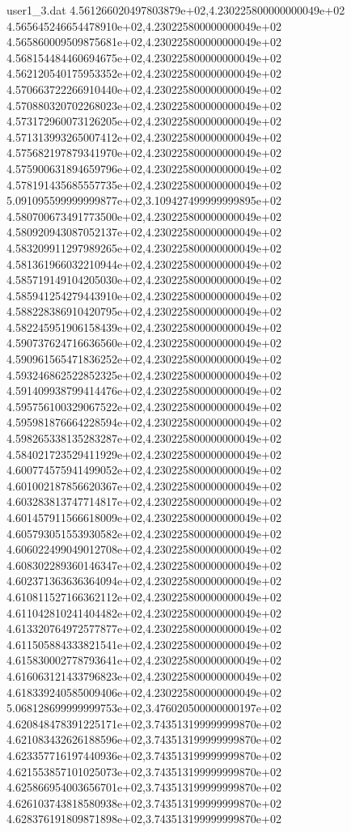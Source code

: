 \begin{filecontents}{user1_3.dat}
4.561266020497803879e+02,4.230225800000000049e+02
4.565645246654478910e+02,4.230225800000000049e+02
4.565860009509875681e+02,4.230225800000000049e+02
4.568154484460694675e+02,4.230225800000000049e+02
4.562120540175953352e+02,4.230225800000000049e+02
4.570663722266910440e+02,4.230225800000000049e+02
4.570880320702268023e+02,4.230225800000000049e+02
4.573172960073126205e+02,4.230225800000000049e+02
4.571313993265007412e+02,4.230225800000000049e+02
4.575682197879341970e+02,4.230225800000000049e+02
4.575900631894659796e+02,4.230225800000000049e+02
4.578191435685557735e+02,4.230225800000000049e+02
5.091095599999999877e+02,3.109427499999999895e+02
4.580700673491773500e+02,4.230225800000000049e+02
4.580920943087052137e+02,4.230225800000000049e+02
4.583209911297989265e+02,4.230225800000000049e+02
4.581361966032210944e+02,4.230225800000000049e+02
4.585719149104205030e+02,4.230225800000000049e+02
4.585941254279443910e+02,4.230225800000000049e+02
4.588228386910420795e+02,4.230225800000000049e+02
4.582245951906158439e+02,4.230225800000000049e+02
4.590737624716636560e+02,4.230225800000000049e+02
4.590961565471836252e+02,4.230225800000000049e+02
4.593246862522852325e+02,4.230225800000000049e+02
4.591409938799414476e+02,4.230225800000000049e+02
4.595756100329067522e+02,4.230225800000000049e+02
4.595981876664228594e+02,4.230225800000000049e+02
4.598265338135283287e+02,4.230225800000000049e+02
4.584021723529411929e+02,4.230225800000000049e+02
4.600774575941499052e+02,4.230225800000000049e+02
4.601002187856620367e+02,4.230225800000000049e+02
4.603283813747714817e+02,4.230225800000000049e+02
4.601457911566618009e+02,4.230225800000000049e+02
4.605793051553930582e+02,4.230225800000000049e+02
4.606022499049012708e+02,4.230225800000000049e+02
4.608302289360146347e+02,4.230225800000000049e+02
4.602371363636364094e+02,4.230225800000000049e+02
4.610811527166362112e+02,4.230225800000000049e+02
4.611042810241404482e+02,4.230225800000000049e+02
4.613320764972577877e+02,4.230225800000000049e+02
4.611505884333821541e+02,4.230225800000000049e+02
4.615830002778793641e+02,4.230225800000000049e+02
4.616063121433796823e+02,4.230225800000000049e+02
4.618339240585009406e+02,4.230225800000000049e+02
5.068128699999999753e+02,3.476020500000000197e+02
4.620848478391225171e+02,3.743513199999999870e+02
4.621083432626188596e+02,3.743513199999999870e+02
4.623357716197440936e+02,3.743513199999999870e+02
4.621553857101025073e+02,3.743513199999999870e+02
4.625866954003656701e+02,3.743513199999999870e+02
4.626103743818580938e+02,3.743513199999999870e+02
4.628376191809871898e+02,3.743513199999999870e+02

\end{filecontents}
